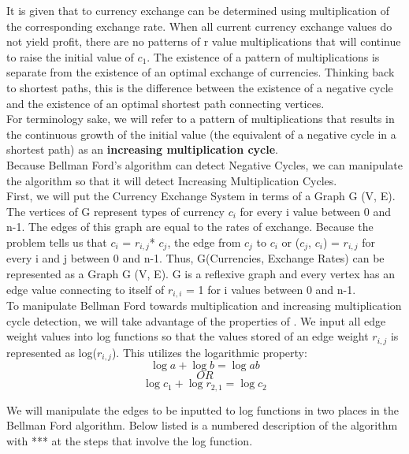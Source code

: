 \documentclass[11pt, solution, letterpaper]{format}
\begin{document}
It is given that to currency exchange can be determined using multiplication of the corresponding exchange rate. When all current currency exchange values do not yield profit, there are no patterns of r value multiplications that will continue to raise the initial value of $c_1$. The existence of a pattern of multiplications is separate from the existence of an optimal exchange of currencies. Thinking back to shortest paths, this is the difference between the existence of a negative cycle and the existence of an optimal shortest path connecting vertices.\\

For terminology sake, we will refer to a pattern of multiplications that results in the continuous growth of the initial value (the equivalent of a negative cycle in a shortest path) as an \textbf{increasing multiplication cycle}. \\

Because Bellman Ford's algorithm can detect Negative Cycles, we can manipulate the algorithm so that it will detect Increasing Multiplication Cycles.\\

First, we will put the Currency Exchange System in terms of a Graph G (V, E). The vertices of G represent types of currency $c_i$ for every i value between 0 and n-1. The edges of this graph are equal to the rates of exchange. Because the problem tells us that $c_i$ = $r_{i,j}$* $c_j$, the edge from $c_j$ to $c_i$ or ($c_j$, $c_i$) = $r_{i,j}$ for every i and j between 0 and n-1. Thus, G(Currencies, Exchange Rates) can be represented as a Graph G (V, E). G is a reflexive graph and every vertex has an edge value connecting to itself of $r_{i,i}$ = 1 for i values between 0 and n-1.  \\


To manipulate Bellman Ford towards multiplication and increasing multiplication cycle detection, we will take advantage of the properties of . We input all edge weight values into log functions so that the values stored of an edge weight $r_{i,j}$ is represented as log($r_{i,j}$). This utilizes the logarithmic property:
$$\log{a} + \log{b} = \log{ab} $$
 $$OR$$
$$\log{c_1} + \log{r_{2,1}} = \log{c_2} $$

We will manipulate the edges to be inputted to log functions in two places in the Bellman Ford algorithm. Below listed is a numbered description of the algorithm with *** at the steps that involve the log function. \\
\end{document}
